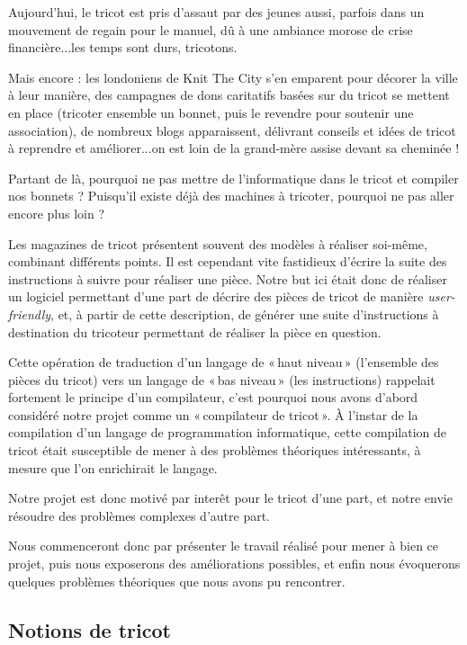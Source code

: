 \documentclass{article}
\begin{document}
Aujourd'hui, le tricot est pris d'assaut par des jeunes aussi, parfois dans
un mouvement de regain pour le manuel, dû à une ambiance morose
de crise financière...les temps sont durs, tricotons. 

Mais encore : les londoniens de Knit The City s'en emparent pour décorer la
ville à leur manière, des campagnes de dons caritatifs basées sur du tricot se
mettent en place (tricoter ensemble un bonnet, puis le revendre pour soutenir
une association), de nombreux blogs apparaissent, délivrant conseils et idées de
tricot à reprendre et améliorer...on est loin de la grand-mère assise devant sa cheminée !

Partant de là, pourquoi ne pas mettre de l'informatique dans le tricot et compiler
nos bonnets ? Puisqu'il existe déjà des machines à tricoter, pourquoi ne pas aller
encore plus loin ? 

Les magazines de tricot présentent souvent des modèles à réaliser
soi-même, combinant différents points. Il est cependant vite
fastidieux d'écrire la suite des instructions à suivre pour réaliser
une pièce. Notre but ici était donc de réaliser un logiciel permettant
d'une part de décrire des pièces de tricot de manière
\emph{user-friendly}, et, à partir de cette description, de générer
une suite d'instructions à destination du tricoteur permettant de
réaliser la pièce en question.

Cette opération de traduction d'un langage de «\,haut niveau\,»
(l'ensemble des pièces du tricot) vers un langage de «\,bas niveau\,»
(les instructions) rappelait fortement le principe d'un compilateur,
c'est pourquoi nous avons d'abord considéré notre projet comme un
«\,compilateur de tricot\,». À l'instar de la compilation d'un langage
de programmation informatique, cette compilation de tricot était
susceptible de mener à des problèmes théoriques intéressants, à mesure
que l'on enrichirait le langage.


Notre projet est donc motivé par interêt pour le tricot d'une part, et notre envie
résoudre des problèmes complexes d'autre part.

Nous commenceront donc par présenter le travail réalisé pour mener à bien ce projet,
puis nous exposerons des améliorations possibles, et enfin nous évoquerons quelques 
problèmes théoriques que nous avons pu rencontrer.


\pagebreak


\subsection*{Notions de tricot} 
\end{document}

